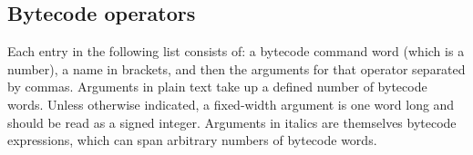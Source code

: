 \documentclass{article}
\begin{document}
 

\normalsize







\subsection{Bytecode operators}  

Each entry in the following list consists of:  a bytecode command word (which is a number), a name in brackets, and then the arguments for that operator separated by commas.  Arguments in plain text take up a defined number of bytecode words.  Unless otherwise indicated, a fixed-width argument is one word long and should be read as a signed integer.  Arguments in italics are themselves bytecode expressions, which can span arbitrary numbers of bytecode words.\\
\end{document}
